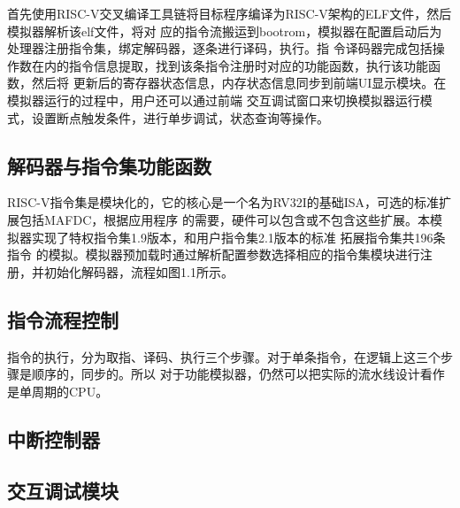 首先使用RISC-V交叉编译工具链将目标程序编译为RISC-V架构的ELF文件，然后模拟器解析该elf文件，将对
应的指令流搬运到bootrom，模拟器在配置启动后为处理器注册指令集，绑定解码器，逐条进行译码，执行。指
令译码器完成包括操作数在内的指令信息提取，找到该条指令注册时对应的功能函数，执行该功能函数，然后将
更新后的寄存器状态信息，内存状态信息同步到前端UI显示模块。在模拟器运行的过程中，用户还可以通过前端
交互调试窗口来切换模拟器运行模式，设置断点触发条件，进行单步调试，状态查询等操作。

\subsection{解码器与指令集功能函数}
RISC-V指令集是模块化的，它的核心是一个名为RV32I的基础ISA，可选的标准扩展包括MAFDC，根据应用程序
的需要，硬件可以包含或不包含这些扩展。本模拟器实现了特权指令集1.9版本，和用户指令集2.1版本的标准
拓展指令集共196条指令
的模拟。模拟器预加载时通过解析配置参数选择相应的指令集模块进行注册，并初始化解码器，流程如图1.1所示。



\subsection{指令流程控制}
指令的执行，分为取指、译码、执行三个步骤。对于单条指令，在逻辑上这三个步骤是顺序的，同步的。所以
对于功能模拟器，仍然可以把实际的流水线设计看作是单周期的CPU。

\subsection{中断控制器}

\subsection{交互调试模块}